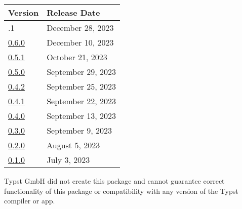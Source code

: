 \begin{longtable}[]{@{}ll@{}}
\toprule\noalign{}
Version & Release Date \\
\midrule\noalign{}
\endhead
\bottomrule\noalign{}
\endlastfoot
0.6.1 & December 28, 2023 \\
\href{https://typst.app/universe/package/ansi-render/0.6.0/}{0.6.0} &
December 10, 2023 \\
\href{https://typst.app/universe/package/ansi-render/0.5.1/}{0.5.1} &
October 21, 2023 \\
\href{https://typst.app/universe/package/ansi-render/0.5.0/}{0.5.0} &
September 29, 2023 \\
\href{https://typst.app/universe/package/ansi-render/0.4.2/}{0.4.2} &
September 25, 2023 \\
\href{https://typst.app/universe/package/ansi-render/0.4.1/}{0.4.1} &
September 22, 2023 \\
\href{https://typst.app/universe/package/ansi-render/0.4.0/}{0.4.0} &
September 13, 2023 \\
\href{https://typst.app/universe/package/ansi-render/0.3.0/}{0.3.0} &
September 9, 2023 \\
\href{https://typst.app/universe/package/ansi-render/0.2.0/}{0.2.0} &
August 5, 2023 \\
\href{https://typst.app/universe/package/ansi-render/0.1.0/}{0.1.0} &
July 3, 2023 \\
\end{longtable}

Typst GmbH did not create this package and cannot guarantee correct
functionality of this package or compatibility with any version of the
Typst compiler or app.
